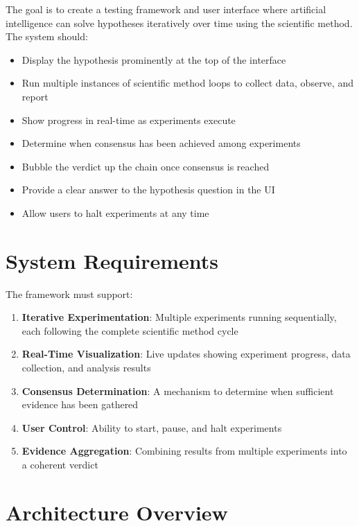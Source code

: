 \documentclass{book}
\begin{document}
The goal is to create a testing framework and user interface where artificial intelligence can solve hypotheses iteratively over time using the scientific method. The system should:

\begin{itemize}
    \item Display the hypothesis prominently at the top of the interface
    \item Run multiple instances of scientific method loops to collect data, observe, and report
    \item Show progress in real-time as experiments execute
    \item Determine when consensus has been achieved among experiments
    \item Bubble the verdict up the chain once consensus is reached
    \item Provide a clear answer to the hypothesis question in the UI
    \item Allow users to halt experiments at any time
\end{itemize}

\section{System Requirements}

The framework must support:

\begin{enumerate}
    \item \textbf{Iterative Experimentation}: Multiple experiments running sequentially, each following the complete scientific method cycle
    \item \textbf{Real-Time Visualization}: Live updates showing experiment progress, data collection, and analysis results
    \item \textbf{Consensus Determination}: A mechanism to determine when sufficient evidence has been gathered
    \item \textbf{User Control}: Ability to start, pause, and halt experiments
    \item \textbf{Evidence Aggregation}: Combining results from multiple experiments into a coherent verdict
\end{enumerate}

\section{Architecture Overview}
\end{document}
